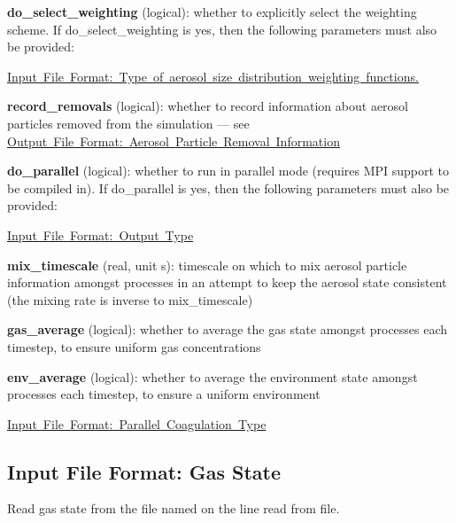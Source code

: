 \begin{DoxyItemize}
\item {\bfseries do\+\_\+select\+\_\+weighting} (logical)\+: whether to explicitly select the weighting scheme. If {\ttfamily do\+\_\+select\+\_\+weighting} is {\ttfamily yes}, then the following parameters must also be provided\+:
\begin{DoxyItemize}
\item \mbox{\hyperlink{input_format_weight_type}{Input File Format\+: Type of aerosol size distribution weighting functions.}}
\end{DoxyItemize}
\item {\bfseries record\+\_\+removals} (logical)\+: whether to record information about aerosol particles removed from the simulation --- see \mbox{\hyperlink{output_format_aero_removed}{Output File Format\+: Aerosol Particle Removal Information}}
\item {\bfseries do\+\_\+parallel} (logical)\+: whether to run in parallel mode (requires M\+PI support to be compiled in). If {\ttfamily do\+\_\+parallel} is {\ttfamily yes}, then the following parameters must also be provided\+:
\begin{DoxyItemize}
\item \mbox{\hyperlink{input_format_output}{Input File Format\+: Output Type}}
\item {\bfseries mix\+\_\+timescale} (real, unit s)\+: timescale on which to mix aerosol particle information amongst processes in an attempt to keep the aerosol state consistent (the mixing rate is inverse to {\ttfamily mix\+\_\+timescale})
\item {\bfseries gas\+\_\+average} (logical)\+: whether to average the gas state amongst processes each timestep, to ensure uniform gas concentrations
\item {\bfseries env\+\_\+average} (logical)\+: whether to average the environment state amongst processes each timestep, to ensure a uniform environment
\item \mbox{\hyperlink{input_format_parallel_coag}{Input File Format\+: Parallel Coagulation Type}} 
\end{DoxyItemize}
\end{DoxyItemize}\hypertarget{input_format_gas_state}{}\subsection{Input File Format\+: Gas State}\label{input_format_gas_state}
Read gas state from the file named on the line read from file.


